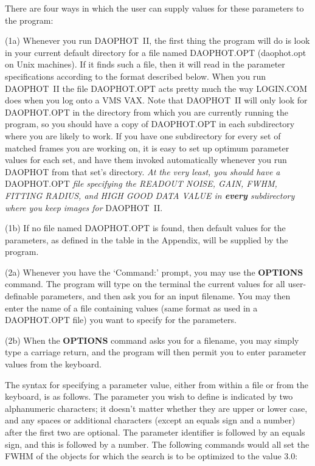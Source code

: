 \noindent There are four ways in which the user can supply values for
these parameters to the program:

\item{(1a)} Whenever you run DAOPHOT~II, the first thing the program
will do is look in your current default directory for a file named
DAOPHOT.OPT (daophot.opt on Unix machines).  If it finds such a file,
then it will read in the parameter specifications according to the
format described below.  When you run DAOPHOT~II the file DAOPHOT.OPT
acts pretty much the way LOGIN.COM does when you log onto a VMS VAX.
Note that DAOPHOT~II will only look for DAOPHOT.OPT in the directory
from which you are currently running the program, so you should have a
copy of DAOPHOT.OPT in each subdirectory where you are likely to work.
If you have one subdirectory for every set of matched frames you are
working on, it is easy to set up optimum parameter values for each set,
and have them invoked automatically whenever you run DAOPHOT from that
set's directory.  {\it At the very least, you should have a}
DAOPHOT.OPT {\it file specifying the READOUT NOISE, GAIN, FWHM, FITTING
RADIUS, and HIGH GOOD DATA VALUE in {\bf every} subdirectory where you
keep images for} DAOPHOT~II.

\item{(1b)}  If no file named DAOPHOT.OPT is found, then default values
for the parameters, as defined in the table in the Appendix, will be
supplied by the program.

\item{(2a)}  Whenever you have the `Command:' prompt, you may use the
{\bf OPTIONS} command.  The program will type on the terminal the
current values for all user-definable parameters, and then ask you for
an input filename.  You may then enter the name of a file containing
values (same format as used in a DAOPHOT.OPT file) you want to specify
for the parameters.

\item{(2b)}  When the {\bf OPTIONS} command asks you for a filename,
you may simply type a carriage return, and the program will then permit
you to enter parameter values from the keyboard.

\noindent The syntax for specifying a parameter value, either from
within a file or from the keyboard, is as follows.  The parameter you
wish to define is indicated by two alphanumeric characters; it doesn't
matter whether they are upper or lower case, and any spaces or
additional characters (except an equals sign and a number) after the
first two are optional.  The parameter identifier is followed by an
equals sign, and this is followed by a number.  The following commands
would all set the FWHM of the objects for which the search is to be
optimized to the value 3.0:

